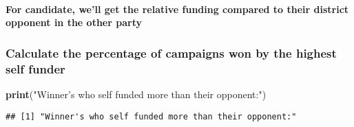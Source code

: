 \documentclass[
]{article}
\newenvironment{Shaded}{\begin{snugshade}}{\end{snugshade}}
\newcommand{\ControlFlowTok}[1]{\textcolor[rgb]{0.13,0.29,0.53}{\textbf{#1}}}
\newcommand{\DataTypeTok}[1]{\textcolor[rgb]{0.13,0.29,0.53}{#1}}
\newcommand{\DecValTok}[1]{\textcolor[rgb]{0.00,0.00,0.81}{#1}}
\newcommand{\FloatTok}[1]{\textcolor[rgb]{0.00,0.00,0.81}{#1}}
\newcommand{\KeywordTok}[1]{\textcolor[rgb]{0.13,0.29,0.53}{\textbf{#1}}}
\newcommand{\NormalTok}[1]{#1}
\newcommand{\OperatorTok}[1]{\textcolor[rgb]{0.81,0.36,0.00}{\textbf{#1}}}
\newcommand{\StringTok}[1]{\textcolor[rgb]{0.31,0.60,0.02}{#1}}
\begin{document}
\hypertarget{for-candidate-well-get-the-relative-funding-compared-to-their-district-opponent-in-the-other-party}{%
\paragraph{For candidate, we'll get the relative funding compared to
their district opponent in the other
party}\label{for-candidate-well-get-the-relative-funding-compared-to-their-district-opponent-in-the-other-party}}

\begin{Shaded}
\end{Shaded}

\hypertarget{calculate-the-percentage-of-campaigns-won-by-the-highest-self-funder}{%
\subsubsection{Calculate the percentage of campaigns won by the highest
self
funder}\label{calculate-the-percentage-of-campaigns-won-by-the-highest-self-funder}}

\begin{Shaded}
\begin{Highlighting}[]
\KeywordTok{print}\NormalTok{(}\StringTok{"Winner's who self funded more than their opponent:"}\NormalTok{)}
\end{Highlighting}
\end{Shaded}

\begin{verbatim}
## [1] "Winner's who self funded more than their opponent:"
\end{verbatim}
\end{document}

